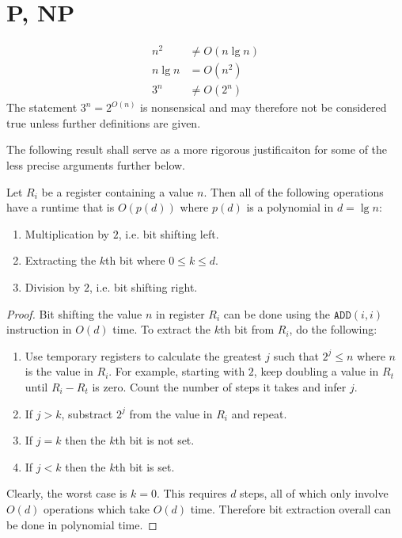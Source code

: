 \documentclass{article}
\begin{document}
\section{P, NP}

\begin{claim*}[a]
	\begin{align}
		\label{on2}
		n^2    & \not=O(n\lg n) \\
		\label{onlgn}
		n\lg n & =O(n^2)        \\
		\label{o3n}
		3^n    & \not=O(2^n)
	\end{align}
	The statement $3^n=2^{O(n)}$ is nonsensical and may therefore not be considered true
	unless further definitions are given.
\end{claim*}

The following result shall serve as a more rigorous justificaiton for some of the less precise 
arguments further below.

\begin{lemma*}
	\label{pbits}	
	Let $R_i$ be a register containing a value $n$. Then all of the following operations
	have a runtime that is $O(p(d))$ where $p(d)$ is a polynomial in $d=\lg n$:
	\begin{enumerate}
		\item Multiplication by $2$, i.e. bit shifting left.
		\item Extracting the $k$th bit where $0\leq k\leq d$.
		\item Division by $2$, i.e. bit shifting right.
	\end{enumerate}
	\begin{proof}
		Bit shifting the value $n$ in register $R_i$ can be done using the $\texttt{ADD}(i,i)$
		instruction in $O(d)$ time.
		To extract the $k$th bit from $R_i$, do the following:
		\begin{enumerate}
			\item Use temporary registers to calculate the greatest $j$ such that $2^j\leq n$
				where $n$ is the value in $R_i$.
				For example, starting with $2$, keep doubling a value in $R_t$ until $R_i-R_t$ 
				is zero. Count the number of steps it takes and infer $j$.
			\item If $j>k$, substract $2^j$ from the value in $R_i$ and repeat.
			\item If $j=k$ then the $k$th bit is not set.
			\item If $j<k$ then the $k$th bit is set.
		\end{enumerate}
		Clearly, the worst case is $k=0$. This requires $d$ steps, all of which only involve 
		$O(d)$ operations which take $O(d)$ time. Therefore bit extraction overall can be done 
		in polynomial time.
	\end{proof}
\end{lemma*}
\end{document}
